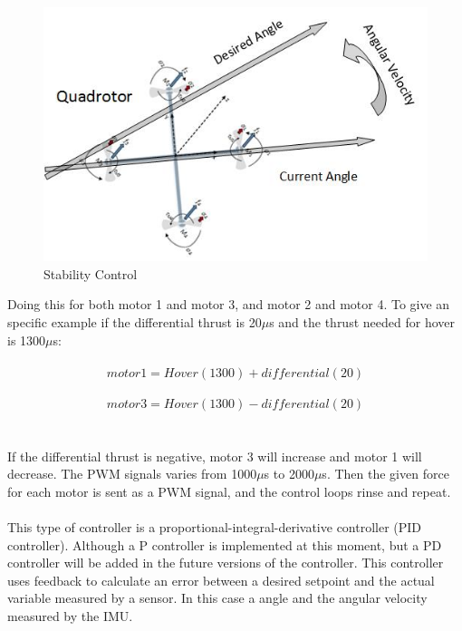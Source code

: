 \begin{figure}[H]
          \centering
            \includegraphics[scale = 0.67]{VAPIQ-PICTURES/OnBCS.jpg}
                \caption{Stability Control}
                \label{StabiilityControl}
            \label{dir}
\end{figure} 
\noindent
Doing this for both motor 1 and motor 3, and motor 2 and motor 4. To give an specific example if the differential thrust is 20$\mu$s and the thrust needed for hover is 1300$\mu$s: 
\\\\
$$motor1 = Hover (1300) + differential (20)$$ \\
$$motor3 = Hover (1300) - differential (20)$$ 
\\\\
If the differential thrust is negative, motor 3 will increase and motor 1 will decrease. The PWM signals varies from 1000$\mu$s to 2000$\mu$s. Then the given force for each motor is sent as a PWM signal, and the control loops rinse and repeat.
\\\\
This type of controller is a proportional-integral-derivative controller (PID controller). Although a P controller is implemented at this moment, but a PD controller will be added in the future versions of the controller. This controller uses feedback to calculate an error between a desired setpoint and the actual variable measured by a sensor. In this case a angle and the angular velocity measured by the IMU.

\clearpage


